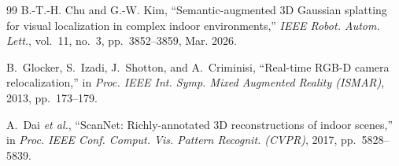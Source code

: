 \documentclass[journal]{IEEEtran}
\begin{document}
\begin{thebibliography}{99}
 B.-T.-H. Chu and G.-W. Kim, ``Semantic-augmented 3D
Gaussian splatting for visual localization in complex indoor environments,''
\emph{IEEE Robot. Autom. Lett.}, vol.~11, no.~3, pp.~3852--3859, Mar. 2026.

 B.~Glocker, S.~Izadi, J.~Shotton, and A.~Criminisi,
``Real-time RGB-D camera relocalization,'' in \emph{Proc. IEEE Int. Symp. Mixed
Augmented Reality (ISMAR)}, 2013, pp.~173--179.

 A.~Dai \emph{et al.}, ``ScanNet: Richly-annotated 3D
reconstructions of indoor scenes,'' in \emph{Proc. IEEE Conf. Comput. Vis.
Pattern Recognit. (CVPR)}, 2017, pp.~5828--5839.
\end{thebibliography}
\end{document}
